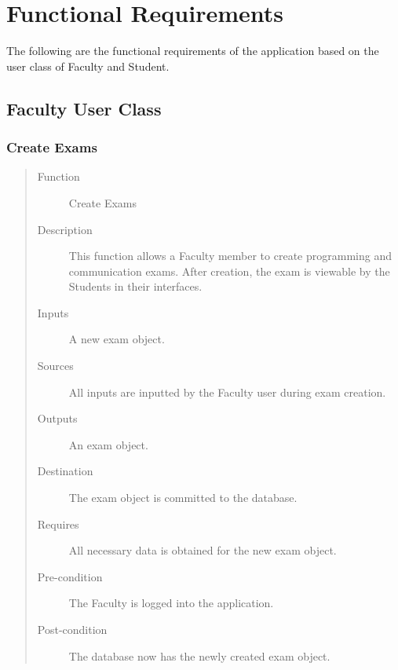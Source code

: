 %
%

\section{Functional Requirements}
The following are the functional requirements of the application based on the
user class of Faculty and Student.
\subsection{Faculty User Class}
\subsubsection{Create Exams} 
\begin{quote} %
\begin{description}
\item[Function]
   Create Exams
\item[Description]
   This function allows a Faculty member to create programming and communication
   exams. After creation, the exam is viewable by the Students in their
   interfaces.
\item[Inputs]
   A new exam object.
\item[Sources]
   All inputs are inputted by the Faculty user during exam creation.
\item[Outputs]
   An exam object.
\item[Destination]
   The exam object is committed to the database.
\item[Requires]
   All necessary data is obtained for the new exam object.
\item[Pre-condition]
   The Faculty is logged into the application.
\item[Post-condition]
   The database now has the newly created exam object.
\end{description}
\end{quote} %


